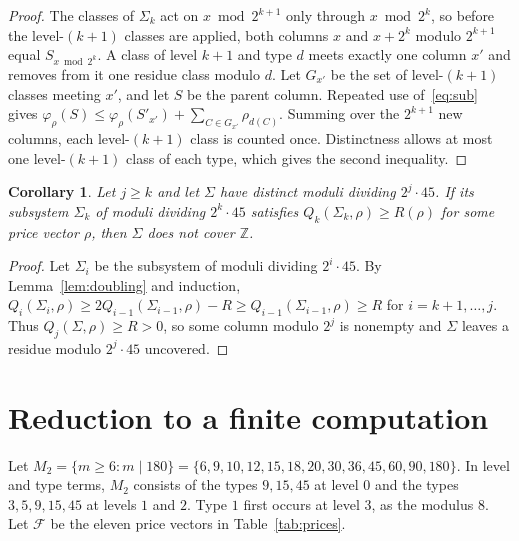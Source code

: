 \documentclass[11pt]{amsart}
\newtheorem{corollary}[theorem]{Corollary}
\theoremstyle{definition}
\theoremstyle{remark}
\newcommand{\Z}{\mathbb Z}
\begin{document}
\begin{proof}
The classes of $\Sigma_k$ act on $x\bmod 2^{k+1}$ only through $x\bmod 2^k$, so before the level-$(k+1)$ classes are applied, both columns $x$ and $x+2^k$ modulo $2^{k+1}$ equal $S_{x\bmod 2^k}$. A class of level $k+1$ and type $d$ meets exactly one column $x'$ and removes from it one residue class modulo $d$. Let $G_{x'}$ be the set of level-$(k+1)$ classes meeting $x'$, and let $S$ be the parent column. Repeated use of~\eqref{eq:sub} gives $\varphi_\rho(S)\le\varphi_\rho(S'_{x'})+\sum_{C\in G_{x'}}\rho_{d(C)}$. Summing over the $2^{k+1}$ new columns, each level-$(k+1)$ class is counted once. Distinctness allows at most one level-$(k+1)$ class of each type, which gives the second inequality.
\end{proof}

\begin{corollary}\label{cor:dead}
Let $j\ge k$ and let $\Sigma$ have distinct moduli dividing $2^j\cdot45$. If its subsystem $\Sigma_k$ of moduli dividing $2^k\cdot45$ satisfies $Q_k(\Sigma_k,\rho)\ge R(\rho)$ for some price vector $\rho$, then $\Sigma$ does not cover $\Z$.
\end{corollary}

\begin{proof}
Let $\Sigma_i$ be the subsystem of moduli dividing $2^i\cdot45$. By Lemma~\ref{lem:doubling} and induction, $Q_{i}(\Sigma_i,\rho)\ge 2Q_{i-1}(\Sigma_{i-1},\rho)-R\ge Q_{i-1}(\Sigma_{i-1},\rho)\ge R$ for $i=k+1,\dots,j$. Thus $Q_j(\Sigma,\rho)\ge R>0$, so some column modulo $2^j$ is nonempty and $\Sigma$ leaves a residue modulo $2^j\cdot45$ uncovered.
\end{proof}

\section{Reduction to a finite computation}\label{sec:computation}

Let $M_2=\{m\ge6: m\mid 180\}=\{6,9,10,12,15,18,20,30,36,45,60,90,180\}$. In level and type terms, $M_2$ consists of the types $9,15,45$ at level $0$ and the types $3,5,9,15,45$ at levels $1$ and $2$. Type $1$ first occurs at level $3$, as the modulus $8$. Let $\mathcal F$ be the eleven price vectors in Table~\ref{tab:prices}.
\end{document}
